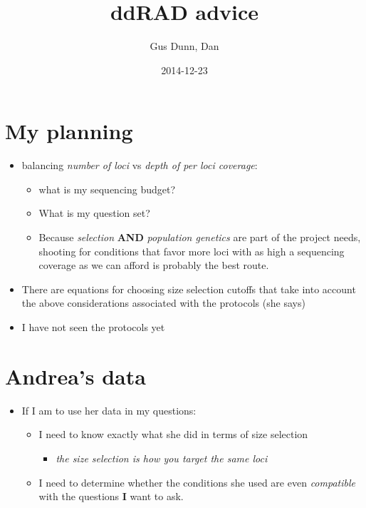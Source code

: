 \documentclass[letterpaper]{scrartcl}
\title{ddRAD advice}
\author{Gus Dunn, Dan}
\date{2014-12-23}
\begin{document}
\maketitle

{
\hypersetup{linkcolor=black}
\setcounter{tocdepth}{3}
\tableofcontents
}
\section{My planning}\label{my-planning}

\begin{itemize}
\itemsep1pt\parskip0pt
\item
  balancing \emph{number of loci} vs \emph{depth of per loci coverage}:

  \begin{itemize}
  \itemsep1pt\parskip0pt
  \item
    what is my sequencing budget?
  \item
    What is my question set?
  \item
    Because \emph{selection} \textbf{AND} \emph{population genetics} are
    part of the project needs, shooting for conditions that favor more
    loci with as high a sequencing coverage as we can afford is probably
    the best route.
  \end{itemize}
\item
  There are equations for choosing size selection cutoffs that take into
  account the above considerations associated with the protocols (she
  says)
\item
  I have not seen the protocols yet
\end{itemize}

\section{Andrea's data}\label{andreas-data}

\begin{itemize}
\itemsep1pt\parskip0pt
\item
  If I am to use her data in my questions:

  \begin{itemize}
  \itemsep1pt\parskip0pt
  \item
    I need to know exactly what she did in terms of size selection

    \begin{itemize}
    \itemsep1pt\parskip0pt
    \item
      \emph{the size selection is how you target the same loci}
    \end{itemize}
  \item
    I need to determine whether the conditions she used are even
    \emph{compatible} with the questions \textbf{I} want to ask.
  \end{itemize}
\end{itemize}
\end{document}
